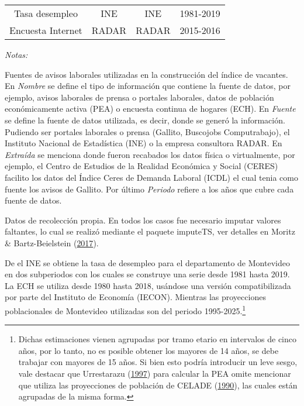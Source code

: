 \documentclass[12pt,oneside]{reedthesis}
\begin{document}
\begin{table}[!h]
\begin{threeparttable}
\begin{tabular}[t]{cccc}
Tasa desempleo & INE & INE & 1981-2019\\
Encuesta Internet & RADAR & RADAR & 2015-2016\\
\bottomrule
\end{tabular}
\begin{tablenotes}
\item \textit{Notas:} 
\item \footnotesize Fuentes de avisos laborales utilizadas en la construcción del índice de vacantes. En \textit{Nombre} se define el tipo de información que contiene la fuente de datos, por ejemplo, avisos laborales de prensa o portales laborales, datos de población económicamente activa (PEA) o encuesta continua de hogares (ECH). En \textit{Fuente} se define la fuente de datos utilizada, es decir, donde se generó la información. Pudiendo ser portales laborales o prensa (Gallito, Buscojobs Computrabajo), el Instituto Nacional de Estadística (INE) o la empresa consultora RADAR. En \textit{Extraída} se menciona donde fueron recabados los datos física o virtualmente, por ejemplo, el Centro de Estudios de la Realidad Económica y Social (CERES) facilito los datos del Índice Ceres de Demanda Laboral (ICDL) el cual tenia como fuente los avisos de Gallito. Por último \textit{Periodo} refiere a los años que cubre cada fuente de datos.
\item[1] Datos de recolección propia. En todos los casos fue necesario imputar valores faltantes, lo cual se realizó mediante el paquete imputeTS, ver detalles en Moritz \& Bartz-Beielstein (\protect\hyperlink{ref-Moritz2017}{2017}).
\end{tablenotes}
\end{threeparttable}
\end{table}




De el INE se obtiene la tasa de desempleo para el departamento de Montevideo en dos subperiodos con los cuales se construye una serie desde 1981 hasta 2019. La ECH se utiliza desde 1980 hasta 2018, usándose una versión compatibilizada por parte del Instituto de Economía (IECON). Mientras las proyecciones poblacionales de Montevideo utilizadas son del periodo 1995-2025.\footnote{Dichas estimaciones vienen agrupadas por tramo etario en intervalos de cinco años, por lo tanto, no es posible obtener los mayores de 14 años, se debe trabajar con mayores de 15 años. Si bien esto podría introducir un leve sesgo, vale destacar que Urrestarazu (\protect\hyperlink{ref-Urrestarazu1997}{1997}) para calcular la PEA omite mencionar que utiliza las proyecciones de población de CELADE (\protect\hyperlink{ref-Celade1990}{1990}), las cuales están agrupadas de la misma forma.}
\end{document}

